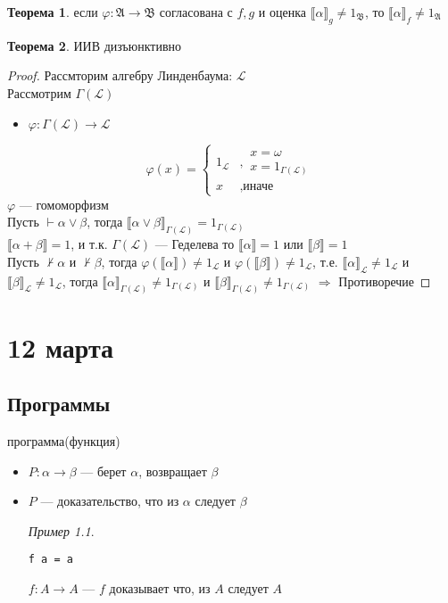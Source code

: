 \documentclass[oneside]{book}
\newcommand{\A}{\mathfrak{A}}
\newcommand{\B}{\mathfrak{B}}
\theoremstyle{plain}
\theoremstyle{remark}
\newtheorem*{examp}{Пример}
\theoremstyle{definition}
\newtheorem{theorem}{Теорема}[section]
\begin{document}
\begin{theorem}
если \(\varphi: \A \to \B\) согласована с \(f, g\) и оценка \(\llbracket \alpha \rrbracket_g \neq 1_\B\), то \(\llbracket \alpha \rrbracket_f \neq 1_\A\)
\end{theorem}
\begin{theorem}
ИИВ дизъюнктивно
\end{theorem}
\begin{proof}
Рассмторим алгебру Линденбаума: \(\mathcal{L}\) \\
Рассмотрим \(\Gamma(\mathcal{L})\) \\
\begin{itemize}
\item \(\varphi: \Gamma(\mathcal{L}) \to \mathcal{L}\)
\end{itemize}
\[ \varphi(x) = \begin{cases}1_\mathcal{L} & ,\substack{x =\omega \\ x = 1_{\Gamma(\mathcal{L})}} \\ x & , \text{иначе}\end{cases} \] 
\(\varphi\) --- гомоморфизм \\
Пусть \(\vdash \alpha \vee \beta\), тогда \(\llbracket \alpha \vee \beta \rrbracket_{\Gamma(\mathcal{L})} = 1_{\Gamma(\mathcal{L})}\) \\
\(\llbracket \alpha + \beta \rrbracket = 1\), и т.к. \(\Gamma(\mathcal{L})\) --- Геделева то \(\llbracket \alpha \rrbracket = 1\) или \(\llbracket \beta \rrbracket = 1\) \\
Пусть \(\not \vdash \alpha\) и \(\not \vdash \beta\), тогда \(\varphi(\llbracket \alpha \rrbracket) \neq 1_\mathcal{L}\) и \(\varphi(\llbracket \beta \rrbracket) \neq 1_\mathcal{L}\), т.е. \(\llbracket \alpha \rrbracket_\mathcal{L} \neq 1_\mathcal{L}\) и \(\llbracket \beta \rrbracket_\mathcal{L} \neq 1_\mathcal{L}\), тогда \(\llbracket \alpha \rrbracket_{\Gamma(\mathcal{L})} \neq 1_{\Gamma(\mathcal{L})}\) и \(\llbracket \beta \rrbracket_{\Gamma(\mathcal{L})} \neq 1_{\Gamma(\mathcal{L})}\) \(\Rightarrow\) Противоречие
\end{proof}
\chapter{12 марта}
\label{sec:orgf726608}
\section{Программы}
\label{sec:org1e1a264}
программа(функция)
\begin{itemize}
\item \(P: \alpha \to \beta\) --- берет \(\alpha\), возвращает \(\beta\)
\item \(P\) --- доказательство, что из \(\alpha\) следует \(\beta\)
\begin{examp}
\-
\begin{verbatim}
f a = a
\end{verbatim}
\(f: A \to A\) --- \(f\) доказывает что, из \(A\) следует \(A\)
\end{examp}
\end{itemize}
\end{document}
